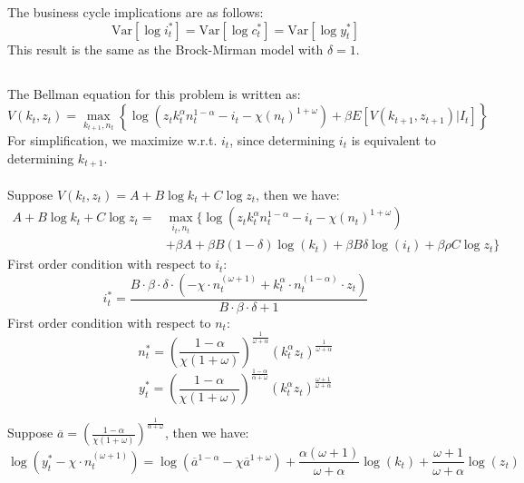 \documentclass{article}
\begin{document}
The business cycle implications are as follows:
\begin{equation}
    \mathrm{Var}[\log i_t^*] = \mathrm{Var}[\log c_t^*] = \mathrm{Var}[\log y_t^*]
\end{equation}
This result is the same as the Brock-Mirman model with \(\delta = 1\).

\subsection{}
The Bellman equation for this problem is written as:
\begin{equation}
    V(k_t, z_t) = \max_{k_{t+1}, n_t} \left\{ \log\left(z_t k_t^\alpha n_t^{1-\alpha}-i_t-\chi (n_t)^{1+\omega}\right) + \beta E[V(k_{t+1}, z_{t+1}) | I_t] \right\}
\end{equation}
For simplification, we maximize w.r.t. \(i_t\), since determining \(i_t\) is equivalent to determining \(k_{t+1}\). \\ \\
Suppose \(V(k_t, z_t) = A + B \log k_t + C \log z_t\), then we have:
\begin{align*}
    A +  B \log k_t + C \log z_t = & \max_{i_{t}, n_t} \{ \log\left(z_t k_t^\alpha n_t^{1-\alpha}-i_t-\chi (n_t)^{1+\omega}\right) \\
    &  + \beta A + \beta B (1-\delta) \log (k_{t}) + \beta B \delta \log(i_t) + \beta \rho C \log z_{t} \}
\end{align*}
First order condition with respect to \(i_t\):\\
\begin{equation}
    i_t^* = \frac{{B \cdot \beta \cdot \delta \cdot (-\chi \cdot n_t^{(\omega + 1)} + k_t^{\alpha} \cdot n_t^{(1 - \alpha)} \cdot z_t)}}{{B \cdot \beta \cdot \delta + 1}}
\end{equation}
First order condition with respect to \(n_t\):\\
\begin{equation}
    n_t^* = \left(\frac{1-\alpha}{\chi (1+\omega)}\right)^{\frac{1}{\omega + \alpha}} \left(k_t^\alpha z_t\right)^{\frac{1}{\omega + \alpha}}
\end{equation}
\begin{equation}
    y_t^* = \left(\frac{1-\alpha}{\chi (1+\omega)}\right)^{\frac{1-\alpha}{\alpha + \omega}} \left(k_t^\alpha z_t\right)^{\frac{\omega + 1}{\omega + \alpha}}
\end{equation}

Suppose \(\overline{a} = \left(\frac{1-\alpha}{\chi (1+\omega)}\right)^{\frac{1}{\alpha + \omega}}\), then we have:
\begin{equation}
\log(y_t^* -\chi \cdot n_t^{(\omega + 1)}) = \log\left(\overline{a}^{1-\alpha} - \chi \overline{a}^{1+\omega}\right)+ \frac{\alpha(\omega + 1)}{\omega + \alpha} \log (k_{t}) + \frac{\omega + 1}{\omega + \alpha} \log(z_t)
\end{equation}
\end{document}
